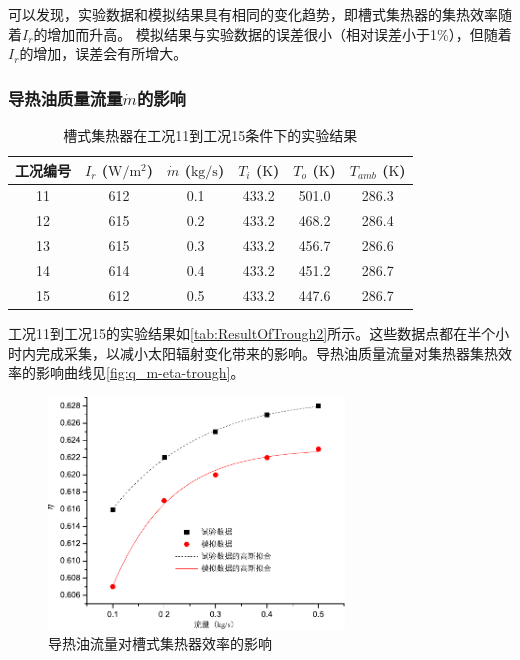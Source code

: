 可以发现，实验数据和模拟结果具有相同的变化趋势，即槽式集热器的集热效率随着$I_r$的增加而升高。
模拟结果与实验数据的误差很小（相对误差小于1\%），但随着$I_r$的增加，误差会有所增大。

\subsubsection{导热油质量流量$\dot{m}$的影响}

\begin{table}[htbp]
	\caption{槽式集热器在工况11到工况15条件下的实验结果}
	\centering
	\begin{tabular}{cccccc}
		\toprule
		工况编号	& $I_r$ ($\mathrm{W/m^2}$)	&	$\dot{m}$ ($\mathrm{kg/s}$)			&	$T_i$ ($\mathrm{K}$)	&	$T_o$ ($\mathrm{K}$)		&	$T_{amb}$ ($\mathrm{K}$)\\
		\midrule
		11	&	612	&	0.1	&	433.2	&	501.0	&	286.3\\
		12	&	615	&	0.2	&	433.2	&	468.2	&	286.4\\
		13	&	615	&	0.3	&	433.2	&	456.7	&	286.6	\\
		14	&	614	&	0.4	&	433.2	&	451.2	&	286.7\\
		15	&	612	&	0.5	&	433.2	&	447.6	&	286.7\\
		\bottomrule
	\end{tabular}
	\label{tab:ResultOfTrough2}
\end{table}
工况11到工况15的实验结果如\autoref{tab:ResultOfTrough2}所示。这些数据点都在半个小时内完成采集，以减小太阳辐射变化带来的影响。导热油质量流量对集热器集热效率的影响曲线见\autoref{fig:q_m-eta-trough}。

\begin{figure}[!ht]
\centering
\includegraphics[width=0.7\textwidth]{fig/q_m-eta-trough}
\caption{导热油流量对槽式集热器效率的影响}
\label{fig:q_m-eta-trough}
\end{figure}


